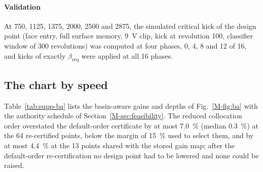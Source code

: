 \paragraph{Validation} At 750, 1125, 1375, 2000, 2500 and \SI{2875}{\rpm}, the simulated critical kick of the design point (face entry, full surface memory, \SI{9}{\volt} clip, kick at revolution 100, classifier window of 300 revolutions) was computed at four phases, 0, 4, 8 and 12 of 16, and kicks of exactly $\beta_{\mathrm{req}}$ were applied at all 16 phases.

\subsection{The chart by speed}\label{supp:ba-table}

Table~\ref{tab:supp-ba} lists the basin-aware gains and depths of Fig.~\ref{M-fig:ba} with the authority schedule of Section~\ref{M-sec:feasibility}. The reduced collocation order overstated the default-order certificate by at most \SI{7.0}{\percent} (median \SI{0.3}{\percent}) at the 64 re-certified points, below the margin of \SI{15}{\percent} used to select them, and by at most \SI{4.4}{\percent} at the 13 points shared with the stored gain map; after the default-order re-certification no design point had to be lowered and none could be raised.

